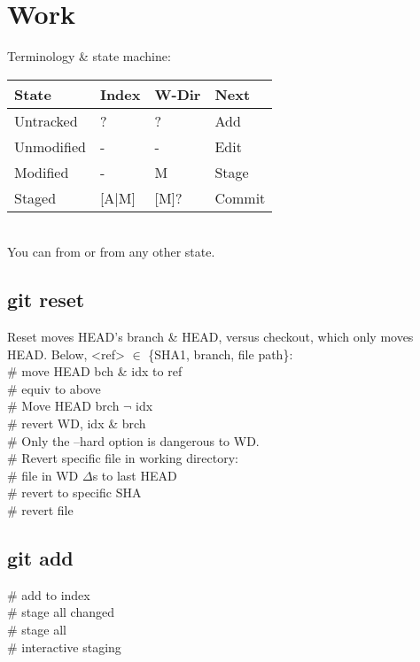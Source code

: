 \section{Work}
Terminology \& state machine: \\
{\scriptsize
\begin{tabular}{l l l l}
    State & Index & W-Dir & Next \\ 
    \hline
    Untracked & ? & ? & Add \\
    Unmodified & - & - & Edit \\
    Modified & - & M & Stage \\
    Staged & [A|M] & [M]? & Commit \\
\end{tabular}
}\\
You can  from  or  from any other state.

\subsection*{git reset}
Reset moves HEAD's branch \& HEAD, versus checkout, which only moves HEAD.  Below, <ref> $\in$ \{SHA1, branch, file path\}:\\
 \# move HEAD bch \& idx to ref\\ 
 \# equiv to above\\
 \# Move HEAD brch $\neg$ idx\\
 \# revert WD, idx \& brch \\
\# Only the --hard option is dangerous to WD.\\
\# Revert specific file in working directory:\\
 \# file in WD $\Delta$s to last HEAD\\
 \# revert to specific SHA \\
 \#  revert file \\

\subsection*{git add}
 \# add to index\\
 \# stage all changed\\
 \# stage all\\
 \# interactive staging \\

